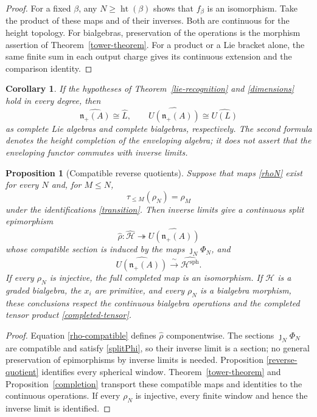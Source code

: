 \documentclass[11pt]{article}
\newtheorem{proposition}[theorem]{Proposition}
\newtheorem{corollary}[theorem]{Corollary}
\newcommand{\htop}{\operatorname{ht}}
\begin{document}
\begin{proof}
For a fixed $\beta$, any $N\geq\htop(\beta)$ shows that $f_\beta$ is an
isomorphism. Take the product of these maps and of their inverses.
Both are continuous for the height topology. For bialgebras, preservation
of the operations is the morphism assertion of Theorem~\ref{tower-theorem}.
For a product or a Lie bracket alone, the same finite sum in each output
charge gives its continuous extension and the comparison identity.
\end{proof}

\begin{corollary}
If the hypotheses of Theorem~\ref{lie-recognition} and
\eqref{dimensions} hold in every degree, then
\[
 \widehat{\mathfrak n_+(A)}\cong\widehat L,\qquad
 \widehat{U(\mathfrak n_+(A))}\cong\widehat{U(L)}
\]
as complete Lie algebras and complete bialgebras, respectively.  The second
formula denotes the height completion of the enveloping algebra; it does
not assert that the enveloping functor commutes with inverse limits.
\end{corollary}

\begin{proposition}[Compatible reverse quotients]             \label{complete-quotients}
Suppose that maps \eqref{rhoN} exist for every $N$ and, for $M\leq N$,
\begin{equation}
 \tau_{\leq M}(\rho_N)=\rho_M                              \label{rho-compatible}
\end{equation}
under the identifications \eqref{transition}.  Then inverse limits give a
continuous split epimorphism
\[
 \widehat\rho:\widehat{\mathcal H}\twoheadrightarrow
 \widehat{U(\mathfrak n_+(A))}
\]
whose compatible section is induced by the maps $\jmath_N\Phi_N$, and
\[
 \widehat{U(\mathfrak n_+(A))}
 \xrightarrow{\ \sim\ }
 \widehat{\mathcal H^{\mathrm{sph}}}.
\]
If every $\rho_N$ is injective, the full completed map is an isomorphism.
If $\mathcal H$ is a graded bialgebra, the $x_i$ are primitive, and every
$\rho_N$ is a bialgebra morphism, these conclusions respect the continuous
bialgebra operations and the completed tensor product
\eqref{completed-tensor}.
\end{proposition}

\begin{proof}
Equation \eqref{rho-compatible} defines $\widehat\rho$ componentwise.
The sections $\jmath_N\Phi_N$ are compatible and satisfy
\eqref{splitPhi}, so their inverse limit is a section; no general
preservation of epimorphisms by inverse limits is needed.  Proposition
\ref{reverse-quotient} identifies every spherical window.
Theorem~\ref{tower-theorem} and Proposition~\ref{completion} transport
these compatible maps and identities to the continuous operations.  If every
$\rho_N$ is injective, every finite window and hence the inverse limit is
identified.
\end{proof}
\end{document}
